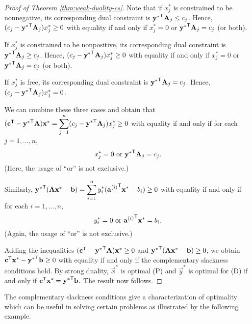 \begin{proof}[\emph{Proof} of Theorem \ref{thm:weak-duality-cs}]

Note that if \(x^*_j\) is constrained to be nonnegative, its
corresponding dual constraint is \(\mathbf{y^*}^{\mathsf{T}} \mathbf{A}_j \leq c_j\).
Hence, \((c_j - \mathbf{y^*}^{\mathsf{T}} \mathbf{A}_j)x^*_j \geq 0\) with equality if
and only if \(x^*_j = 0\) or \(\mathbf{y^*}^{\mathsf{T}} \mathbf{A}_j = c_j\) (or both).

If \(x^*_j\) is constrained to be nonpositive, its corresponding dual
constraint is \(\mathbf{y^*}^{\mathsf{T}} \mathbf{A}_j \geq c_j\). Hence,
\((c_j - \mathbf{y^*}^{\mathsf{T}} \mathbf{A}_j)x^*_j \geq 0\) with equality if and only
if \(x^*_j = 0\) or \(\mathbf{y^*}^{\mathsf{T}} \mathbf{A}_j = c_j\) (or both).

If \(x^*_j\) is free, its corresponding dual constraint is
\(\mathbf{y^*}^{\mathsf{T}} \mathbf{A}_j = c_j\). Hence,
\((c_j - \mathbf{y^*}^{\mathsf{T}} \mathbf{A}_j)x^*_j = 0\).

We can combine these three cases and obtain that
\((\mathbf{c}^{\mathsf{T}} - \mathbf{y^*}^{\mathsf{T}} \mathbf{A})\mathbf{x^*} = \displaystyle\sum_{j = 1}^n (c_j - \mathbf{y^*}^{\mathsf{T}} \mathbf{A}_j) x^*_j \geq 0\)
with equality if and only if for each \(j = 1,\ldots, n\),
\[x^*_j = 0 \mbox{ or } \mathbf{y^*}^{\mathsf{T}} \mathbf{A}_j = c_j.\] (Here, the usage
of ``or'' is not exclusive.)

Similarly,
\(\mathbf{y^*}^{\mathsf{T}}(\mathbf{A}\mathbf{x^*} - \mathbf{b}) = \displaystyle\sum_{i = 1}^n y^*_i({\mathbf{a}^{(i)}}^{\mathsf{T}} \mathbf{x^*} - b_i) \geq 0\)
with equality if and only if for each \(i = 1,\ldots, n\),
\[y^*_i = 0 \mbox{ or } {\mathbf{a}^{(i)}}^{\mathsf{T}} \mathbf{x^*} = b_i.\] (Again,
the usage of ``or'' is not exclusive.)

Adding the inequalities
\((\mathbf{c}^{\mathsf{T}} - \mathbf{y^*}^{\mathsf{T}} \mathbf{A})\mathbf{x^*} \geq 0\) and
\(\mathbf{y^*}^{\mathsf{T}}(\mathbf{A}\mathbf{x^*} - \mathbf{b}) \geq 0\), we obtain
\(\mathbf{c}^{\mathsf{T}}\mathbf{x}^* - \mathbf{y^*}^{\mathsf{T}}\mathbf{b} \geq 0\) with equality if
and only if the complementary slackness conditions hold. By strong
duality, \(\vec{x}^*\) is optimal (P) and \(\vec{y}^*\) is optimal for
(D) if and only if \(\mathbf{c}^{\mathsf{T}} \mathbf{x}^* = \mathbf{y^*}^{\mathsf{T}}\mathbf{b}.\) The
result now follows.

\end{proof}

The complementary slackness conditions give a characterization of
optimality which can be useful in solving certain problems as
illustrated by the following example.

